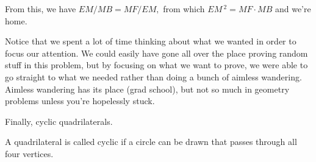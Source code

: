 







From this, we have $EM/MB = MF/EM,$ from which $EM\,^2 = MF \cdot MB$ and we're home.

Notice that we spent a lot of time thinking about what we wanted in order to focus our attention. We could easily have gone all over the place proving random stuff in this problem, but by focusing on what we want to prove, we were able to go straight to what we needed rather than doing a bunch of aimless wandering. Aimless wandering has its place (grad school), but not so much in geometry problems unless you're hopelessly stuck.

Finally, cyclic quadrilaterals.

A quadrilateral is called cyclic if a circle can be drawn that passes through all four vertices.




